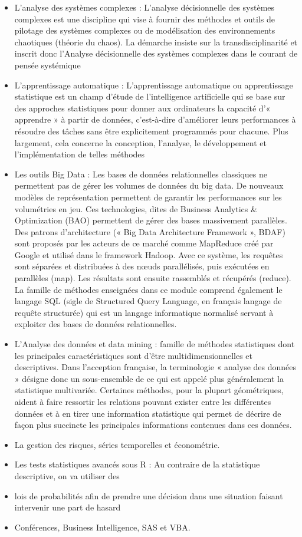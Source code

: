 \documentclass[
  letterpaper,
  DIV=11,
  numbers=noendperiod]{scrreprt}
\begin{document}
\begin{itemize}
\item
  L'analyse des systèmes complexes : L'analyse décisionnelle des
  systèmes complexes est une discipline qui vise à fournir des méthodes
  et outils de pilotage des systèmes complexes ou de modélisation des
  environnements chaotiques (théorie du chaos). La démarche insiste sur
  la transdisciplinarité et inscrit donc l'Analyse décisionnelle des
  systèmes complexes dans le courant de pensée systémique
\item
  L'apprentissage automatique : L'apprentissage automatique ou
  apprentissage statistique est un champ d'étude de l'intelligence
  artificielle qui se base sur des approches statistiques pour donner
  aux ordinateurs la capacité d'« apprendre » à partir de données,
  c'est-à-dire d'améliorer leurs performances à résoudre des tâches sans
  être explicitement programmés pour chacune. Plus largement, cela
  concerne la conception, l'analyse, le développement et
  l'implémentation de telles méthodes
\item
  Les outils Big Data : Les bases de données relationnelles classiques
  ne permettent pas de gérer les volumes de données du big data. De
  nouveaux modèles de représentation permettent de garantir les
  performances sur les volumétries en jeu. Ces technologies, dites de
  Business Analytics \& Optimization (BAO) permettent de gérer des bases
  massivement parallèles. Des patrons d'architecture (« Big Data
  Architecture Framework », BDAF) sont proposés par les acteurs de ce
  marché comme MapReduce créé par Google et utilisé dans le framework
  Hadoop. Avec ce système, les requêtes sont séparées et distribuées à
  des nœuds parallélisés, puis exécutées en parallèles (map). Les
  résultats sont ensuite rassemblés et récupérés (reduce). La famille de
  méthodes enseignées dans ce module comprend également le langage SQL
  (sigle de Structured Query Language, en français langage de requête
  structurée) qui est un langage informatique normalisé servant à
  exploiter des bases de données relationnelles.
\item
  L'Analyse des données et data mining : famille de méthodes
  statistiques dont les principales caractéristiques sont d'être
  multidimensionnelles et descriptives. Dans l'acception française, la
  terminologie « analyse des données » désigne donc un sous-ensemble de
  ce qui est appelé plus généralement la statistique multivariée.
  Certaines méthodes, pour la plupart géométriques, aident à faire
  ressortir les relations pouvant exister entre les différentes données
  et à en tirer une information statistique qui permet de décrire de
  façon plus succincte les principales informations contenues dans ces
  données.
\item
  La gestion des risques, séries temporelles et économétrie.
\item
  Les tests statistiques avancés sous R : Au contraire de la statistique
  descriptive, on va utiliser des
\item
  lois de probabilités afin de prendre une décision dans une situation
  faisant intervenir une part de hasard
\item
  Conférences, Business Intelligence, SAS et VBA.
\end{itemize}
\end{document}
